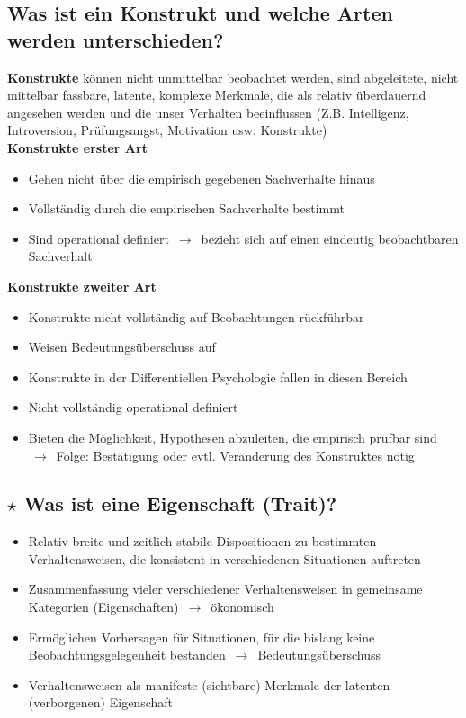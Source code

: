 \documentclass[a4paper,9pt,DIV=14]{scrartcl}
\begin{document}
\subsection{Was ist ein Konstrukt und welche Arten werden unterschieden?}
    \textbf{Konstrukte} können nicht unmittelbar beobachtet werden, sind abgeleitete, nicht mittelbar fassbare, latente, komplexe Merkmale, die als relativ überdauernd angesehen werden und die unser Verhalten beeinflussen (Z.B. Intelligenz, Introversion, Prüfungsangst, Motivation usw. Konstrukte)\\
    \textbf{Konstrukte erster Art}
    \begin{itemize}\itemsep-0.5ex
        \item Gehen nicht über die empirisch gegebenen Sachverhalte hinaus
        \item Vollständig durch die empirischen Sachverhalte bestimmt
        \item Sind operational definiert $\,\to\,$ bezieht sich auf einen eindeutig beobachtbaren Sachverhalt
    \end{itemize}
    \textbf{Konstrukte zweiter Art}
    \begin{itemize}\itemsep-0.5ex
        \item Konstrukte nicht vollständig auf Beobachtungen rückführbar
        \item Weisen Bedeutungsüberschuss auf
        \item Konstrukte in der Differentiellen Psychologie fallen in diesen Bereich
        \item Nicht vollständig operational definiert
        \item Bieten die Möglichkeit, Hypothesen abzuleiten, die empirisch prüfbar sind $\,\to\,$ Folge: Bestätigung oder evtl. Veränderung des Konstruktes nötig
    \end{itemize}
\subsection{$\star$ Was ist eine Eigenschaft (Trait)?}%
    \begin{itemize}\itemsep-0.5ex
        \item Relativ breite und zeitlich stabile Dispositionen zu bestimmten
    Verhaltensweisen, die konsistent in verschiedenen Situationen auftreten
        \item Zusammenfassung vieler verschiedener Verhaltensweisen in
    gemeinsame Kategorien (Eigenschaften) $\,\to\,$ ökonomisch
        \item Ermöglichen Vorhersagen für Situationen, für die bislang keine
    Beobachtungsgelegenheit bestanden $\,\to\,$ Bedeutungsüberschuss
        \item Verhaltensweisen als manifeste (sichtbare) Merkmale der latenten
    (verborgenen) Eigenschaft
    \end{itemize}
\end{document}
